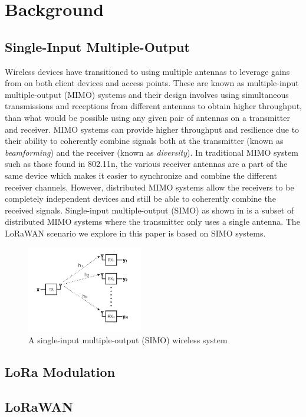 \section{Background}
\label{sec:background}

\subsection{Single-Input Multiple-Output}
\label{sec:simo}

Wireless devices have transitioned to using multiple antennas to leverage gains from on both client devices and access points.
These are known as multiple-input multiple-output (MIMO) systems and their design involves using simultaneous transmissions and receptions from different antennas to obtain higher throughput, than what would be possible using any given pair of antennas on a transmitter and receiver.
MIMO systems can provide higher throughput and resilience due to their ability to coherently combine signals both at the transmitter (known as \textit{beamforming}) and the receiver (known as \textit{diversity}).
In traditional MIMO system such as those found in 802.11n, the various receiver antennas are a part of the same device which makes it easier to synchronize and combine the different receiver channels.
However, distributed MIMO systems allow the receivers to be completely independent devices and still be able to coherently combine the received signals.
Single-input multiple-output (SIMO) as shown in  is a subset of distributed MIMO systems where the transmitter only uses a single antenna.
The LoRaWAN scenario we explore in this paper is based on SIMO systems.

\begin{figure}[!htb]
    \centering
    \includegraphics[width=0.45\textwidth]{figures/SIMO}
    \caption{A single-input multiple-output (SIMO) wireless system}
    \label{fig:simo}
\end{figure}

\subsection{LoRa Modulation}
\label{sec:lora}

\subsection{LoRaWAN}
\label{sec:lorawan}